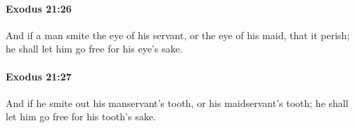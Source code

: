 		\paragraph{Exodus 21:26} %
			\label{EXODUS-21-26}

			And if a man smite the eye of his servant, or the eye of his maid, that it perish; he shall let him go free for his eye's sake.


		\paragraph{Exodus 21:27} %
			\label{EXODUS-21-27}

			And if he smite out his manservant's tooth, or his maidservant's tooth; he shall let him go free for his tooth's sake.


